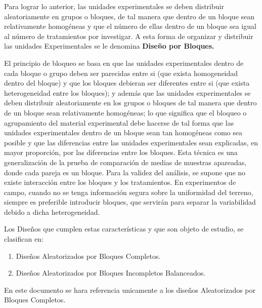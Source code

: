 \documentclass[12pt,letterpaper]{report}
\begin{document}
Para lograr lo anterior, las unidades experimentales se deben distribuir aleatoriamente
en grupos o bloques, de tal manera que dentro de un bloque sean relativamente homogéneas y
que el número de ellas dentro de un bloque sea igual al número de tratamientos por investigar.
A esta forma de organizar y distribuir las unidades Experimentales se le denomina \textbf{Diseño por Bloques.}

El principio de bloqueo se basa en que las unidades experimentales dentro de cada
bloque o grupo deben ser parecidas entre si (que exista homogeneidad dentro del bloque) y
que los bloques debieran ser diferentes entre si (que exista heterogeneidad entre los bloques);
y además que las unidades experimentales se deben distribuir aleatoriamente en los grupos o
bloques de tal manera que dentro de un bloque sean relativamente homogéneas; lo que
significa que el bloqueo o agrupamiento del material experimental debe hacerse de tal forma
que las unidades experimentales dentro de un bloque sean tan homogéneas como sea posible y
que las diferencias entre las unidades experimentales sean explicadas, en mayor proporción,
por las diferencias entre los bloques. Esta técnica es una generalización de la prueba de
comparación de medias de muestras apareadas, donde cada pareja es un bloque. Para la
validez del análisis, se supone que no existe interacción entre los bloques y los tratamientos.
En experimentos de campo, cuando no se tenga información segura sobre la
uniformidad del terreno, siempre es preferible introducir bloques, que servirán para separar la
variabilidad debido a dicha heterogeneidad.

Los Diseños que cumplen estas características y que son objeto de estudio, se
clasifican en:
\begin{enumerate}
  \item Diseños Aleatorizados por Bloques Completos.
  \item Diseños Aleatorizados por Bloques Incompletos Balanceados.
\end{enumerate}
En este documento se hara referencia unicamente a los diseños Aleatorizados por Bloques Completos.
\end{document}
